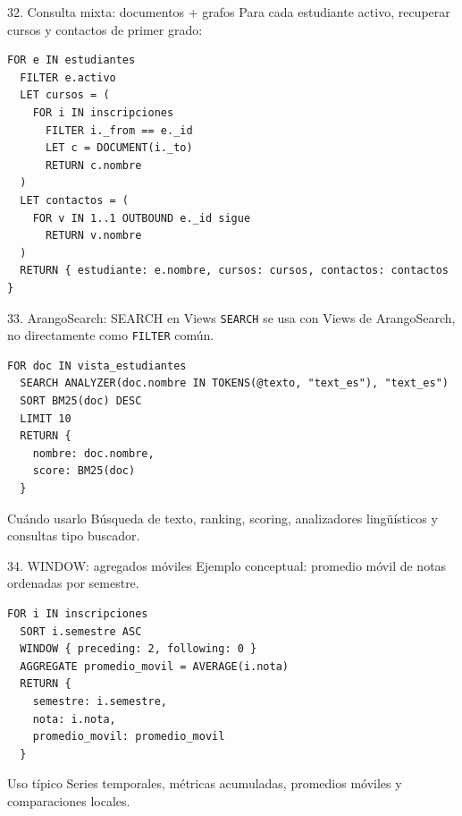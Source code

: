 \documentclass[aspectratio=169,11pt]{beamer}
\begin{document}
\begin{frame}[fragile]{32. Consulta mixta: documentos + grafos}
Para cada estudiante activo, recuperar cursos y contactos de primer grado:

\begin{lstlisting}
FOR e IN estudiantes
  FILTER e.activo
  LET cursos = (
    FOR i IN inscripciones
      FILTER i._from == e._id
      LET c = DOCUMENT(i._to)
      RETURN c.nombre
  )
  LET contactos = (
    FOR v IN 1..1 OUTBOUND e._id sigue
      RETURN v.nombre
  )
  RETURN { estudiante: e.nombre, cursos: cursos, contactos: contactos }
\end{lstlisting}
\end{frame}

\begin{frame}[fragile]{33. ArangoSearch: SEARCH en Views}
\texttt{SEARCH} se usa con Views de ArangoSearch, no directamente como \texttt{FILTER} común.

\begin{lstlisting}
FOR doc IN vista_estudiantes
  SEARCH ANALYZER(doc.nombre IN TOKENS(@texto, "text_es"), "text_es")
  SORT BM25(doc) DESC
  LIMIT 10
  RETURN {
    nombre: doc.nombre,
    score: BM25(doc)
  }
\end{lstlisting}

\begin{block}{Cuándo usarlo}
Búsqueda de texto, ranking, scoring, analizadores lingüísticos y consultas tipo buscador.
\end{block}
\end{frame}

\begin{frame}[fragile]{34. WINDOW: agregados móviles}
Ejemplo conceptual: promedio móvil de notas ordenadas por semestre.

\begin{lstlisting}
FOR i IN inscripciones
  SORT i.semestre ASC
  WINDOW { preceding: 2, following: 0 }
  AGGREGATE promedio_movil = AVERAGE(i.nota)
  RETURN {
    semestre: i.semestre,
    nota: i.nota,
    promedio_movil: promedio_movil
  }
\end{lstlisting}

\begin{block}{Uso típico}
Series temporales, métricas acumuladas, promedios móviles y comparaciones locales.
\end{block}
\end{frame}
\end{document}

